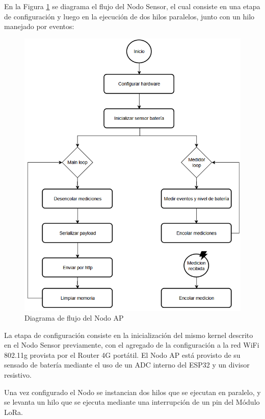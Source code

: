 En la Figura \ref{fig:diagrama-flujo-ap} se diagrama el flujo del Nodo Sensor, el cual consiste en una etapa de configuración y luego en la ejecución de dos hilos paralelos, junto con un hilo manejado por eventos:

\begin{figure}[H]
    \centering
    \includegraphics[width=1\linewidth]{Figures/Firmware/flujo_ap.png}
    \caption{Diagrama de flujo del Nodo AP}
    \label{fig:diagrama-flujo-ap}
\end{figure}

La etapa de configuración consiste en la inicialización del mismo kernel descrito en el Nodo Sensor previamente, con el agregado de la configuración a la red WiFi 802.11g provista por el Router 4G portátil.
El Nodo AP está provisto de su sensado de batería mediante el uso de un ADC interno del ESP32 y un divisor resistivo.

Una vez configurado el Nodo se instancian dos hilos que se ejecutan en paralelo, y se levanta un hilo que se ejecuta mediante una interrupción de un pin del Módulo LoRa.

